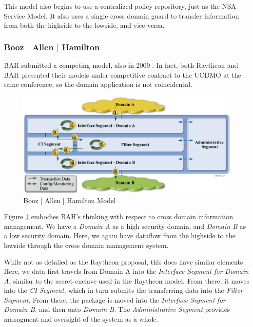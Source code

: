 \documentclass[12pt,letterpaper]{article}
\begin{document}
This model also begins to use a centralized policy repository, just as the NSA Service Model.  It also uses a single cross domain guard to transfer information from both the highside to the lowside, and vice-versa.

\subsubsection{Booz $\mid$ Allen $\mid$ Hamilton}
BAH submitted a competing model, also in 2009 \cite{proposal:bah-arch}.  In fact, both Raytheon and BAH presented their models under competitive contract to the UCDMO at the same conference, so the domain application is not coincidental.

\begin{figure}[!t]
\centering
\includegraphics[width=5in]{bah-arch}
\caption{Booz | Allen | Hamilton Model}
\label{fig:model:conceptual-model-bah}
\end{figure}

Figure \ref{fig:model:conceptual-model-bah} embodies BAH's thinking with respect to cross domain information management.  We have a \textit{Domain A} as a high security domain, and \textit{Domain B} as a low security domain.  Here, we again have dataflow from the highside to the lowside through the cross domain management system.

While not as detailed as the Raytheon proposal, this does have similar elements.  Here, we data first travels from Domain A into the \textit{Interface Segment for Domain A}, similar to the secret enclave used in the Raytheon model.  From there, it moves into the \textit{CI Segment}, which in turn submits the transferring data into the \textit{Filter Segment}.  From there, the package is moved into the \textit{Interface Segment for Domain B}, and then onto \textit{Domain B}.  The \textit{Administrative Segment} provides managment and oversight of the system as a whole.
\end{document}
